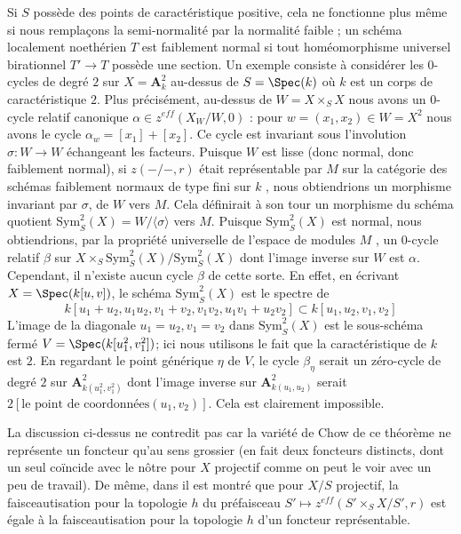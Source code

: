 \begin{remark}
\medskip\noindent
 Si  $S$  possède des points de caractéristique positive, cela ne fonctionne plus même
 si nous remplaçons la semi-normalité par la normalité faible ; un schéma localement 
noethérien  $T$  est faiblement normal si tout homéomorphisme universel birationnel  
$T' \to T$  possède une section. Un exemple consiste à considérer les  $0$-cycles de degré  
$2$  sur  $X = \mathbf{A}^2_k$ au-dessus de  $S = \Spec(k)$  où  $k$  est un corps 
de caractéristique $2$. Plus précisément, au-dessus de  $W = X \times_S X$  nous avons
 un  $0$-cycle relatif canonique  $\alpha \in z^{eff}(X_W/W, 0)$ : pour  
$w = (x_1, x_2) \in W = X^2$  nous avons le cycle $\alpha_w = [x_1] + [x_2]$.
 Ce cycle est invariant sous l'involution  $\sigma : W \to W$  échangeant
 les facteurs. Puisque  $W$  est lisse (donc normal, donc faiblement normal), si 
$z(-/-, r)$  était représentable par  $M$  sur la catégorie des schémas faiblement
 normaux de type fini sur  $k$ , nous obtiendrions un morphisme invariant par  $\sigma$, 
de  $W$  vers  $M$. Cela définirait à son tour un morphisme du 
schéma quotient  $\text{Sym}^2_S(X) = W/\langle \sigma \rangle$  vers  $M$.
 Puisque $\text{Sym}^2_S(X)$  est normal, nous obtiendrions, par la propriété universelle de l'espace de modules $M$
 , un  $0$-cycle relatif  $\beta$  sur  
$X \times_S \text{Sym}^2_S(X) / \text{Sym}^2_S(X)$
  dont l'image inverse sur  $W$  est  $\alpha$. Cependant, il n'existe aucun cycle $\beta$  
de cette sorte. En effet, en écrivant  $X = \Spec(k[u, v])$, le schéma  
$\text{Sym}^2_S(X)$ est le spectre de 
$$
k[u_1 + u_2, u_1u_2, v_1 + v_2, v_1v_2, u_1v_1 + u_2v_2]
\subset
k[u_1, u_2, v_1, v_2]
$$
 L'image de la diagonale  $u_1 = u_2, v_1 = v_2$  dans  $\text{Sym}^2_S(X)$
  est le sous-schéma fermé $V = \Spec(k[u_1^2, v_1^2])$; ici nous utilisons le 
fait que la caractéristique de  $k$ est  $2$. En regardant le 
point générique  $\eta$  de  $V$, le cycle  $\beta_\eta$  serait un 
zéro-cycle de degré  $2$  sur  $\mathbf{A}^2_{k(u_1^2, v_1^2)}$
 dont l'image inverse sur  $\mathbf{A}^2_{k(u_1, u_2)}$  serait  
$2[\text{le point de coordonnées} (u_1, v_2)]$.
 Cela est clairement impossible. 

\medskip\noindent
 La discussion ci-dessus ne contredit pas  \cite[théorème 4.13]{KRC}  car la variété
 de Chow de ce théorème ne représente un foncteur qu'au sens grossier (en
 fait deux foncteurs distincts, dont un seul coïncide avec le nôtre pour  $X$
  projectif comme on peut le voir avec un peu de travail). De même, dans  \cite[section 4.4]{SV}
  il est montré que pour  $X/S$  projectif, la faisceautisation pour la topologie  $h$ du préfaisceau 
$S' \mapsto z^{eff}(S' \times_S X/S', r)$  est égale à la faisceautisation pour la topologie  $h$ d'un foncteur
 représentable. 
\end{remark} 

